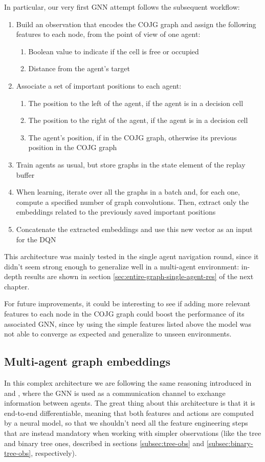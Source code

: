 \documentclass[a4paper,10pt]{report}
\begin{document}
In particular, our very first GNN attempt follows the subsequent workflow:
\begin{enumerate}
	\item Build an observation that encodes the COJG graph and assign the following features to each node, from the point of view of one agent:
	\begin{enumerate}
		\item Boolean value to indicate if the cell is free or occupied
		\item Distance from the agent's target
	\end{enumerate}
	\item Associate a set of important positions to each agent:
	\begin{enumerate}
		\item The position to the left of the agent, if the agent is in a decision cell
		\item The position to the right of the agent, if the agent is in a decision cell
		\item The agent's position, if in the COJG graph, otherwise its previous position in the COJG graph
	\end{enumerate}
	\item Train agents as usual, but store graphs in the state element of the replay buffer
	\item When learning, iterate over all the graphs in a batch and, for each one, compute a specified number of graph convolutions. Then, extract only the embeddings related to the previously saved important positions
	\item Concatenate the extracted embeddings and use this new vector as an input for the DQN
\end{enumerate}

This architecture was mainly tested in the single agent navigation round, since it didn't seem strong enough to generalize well in a multi-agent environment: in-depth results are shown in section \ref{sec:entire-graph-single-agent-res} of the next chapter.

For future improvements, it could be interesting to see if adding more relevant features to each node in the COJG graph could boost the performance of its associated GNN, since by using the simple features listed above the model was not able to converge as expected and generalize to unseen environments. 

\subsection{Multi-agent graph embeddings}\label{subsec:multi-agent-gnn}
In this complex architecture we are following the same reasoning introduced in \cite{dqn-gnn-robot} and \cite{magat}, where the GNN is used as a communication channel to exchange information between agents. The great thing about this architecture is that it is end-to-end differentiable, meaning that both features and actions are computed by a neural model, so that we shouldn't need all the feature engineering steps that are instead mandatory when working with simpler observations (like the tree and binary tree ones, described in sections \ref{subsec:tree-obs} and \ref{subsec:binary-tree-obs}, respectively).
\end{document}
